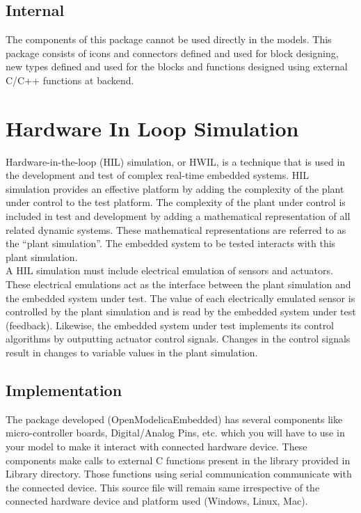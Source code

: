\documentclass[12pt,a4paper]{report}
\newcommand\tab[1][0.5cm]{\hspace*{#1}}
\begin{document}
\section{Internal}
The components of this package cannot be used directly in the models. This package consists of icons and connectors defined and used for block designing, new types defined and used for the blocks and functions designed using external C/C++ functions at backend.

\chapter{\textbf{Hardware In Loop Simulation}}
\tab Hardware-in-the-loop (HIL) simulation, or HWIL, is a technique that is used in the development and test of complex real-time embedded systems. HIL simulation provides an effective platform by adding the complexity of the plant under control to the test platform. The complexity of the plant under control is included in test and development by adding a mathematical representation of all related dynamic systems. These mathematical representations are referred to as the “plant simulation”. The embedded system to be tested interacts with this plant simulation.\\

A HIL simulation must include electrical emulation of sensors and actuators. These electrical emulations act as the interface between the plant simulation and the embedded system under test. The value of each electrically emulated sensor is controlled by the plant simulation and is read by the embedded system under test (feedback). Likewise, the embedded system under test implements its control algorithms by outputting actuator control signals. Changes in the control signals result in changes to variable values in the plant simulation.

\section{Implementation}
\tab The package developed (OpenModelicaEmbedded) has several components like micro-controller boards, Digital/Analog Pins, etc. which you will have to use in your model to make it interact with connected hardware device. These components make calls to external C functions present in the library provided in Library directory. Those functions using serial communication communicate with the connected device. This source file will remain same irrespective of the connected hardware device and platform used (Windows, Linux, Mac).\\
\end{document}
